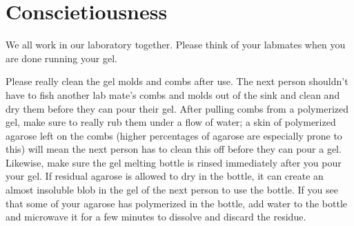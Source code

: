 \documentclass[
  letterpaper,
  DIV=11,
  numbers=noendperiod]{scrreprt}
\begin{document}
\hypertarget{conscietiousness}{%
\section{Conscietiousness}\label{conscietiousness}}

\begin{tcolorbox}[enhanced jigsaw, rightrule=.15mm, title=\textcolor{quarto-callout-warning-color}{\faExclamationTriangle}\hspace{0.5em}{Warning}, titlerule=0mm, opacitybacktitle=0.6, toprule=.15mm, bottomrule=.15mm, opacityback=0, left=2mm, colframe=quarto-callout-warning-color-frame, breakable, coltitle=black, colback=white, colbacktitle=quarto-callout-warning-color!10!white, bottomtitle=1mm, leftrule=.75mm, toptitle=1mm, arc=.35mm]

We all work in our laboratory together. Please think of your labmates
when you are done running your gel.

\end{tcolorbox}

Please really clean the gel molds and combs after use. The next person
shouldn't have to fish another lab mate's combs and molds out of the
sink and clean and dry them before they can pour their gel. After
pulling combs from a polymerized gel, make sure to really rub them under
a flow of water; a skin of polymerized agarose left on the combs (higher
percentages of agarose are especially prone to this) will mean the next
person has to clean this off before they can pour a gel. Likewise, make
sure the gel melting bottle is rinsed immediately after you pour your
gel. If residual agarose is allowed to dry in the bottle, it can create
an almost insoluble blob in the gel of the next person to use the
bottle. If you see that some of your agarose has polymerized in the
bottle, add water to the bottle and microwave it for a few minutes to
dissolve and discard the residue.



\printindex
\end{document}
